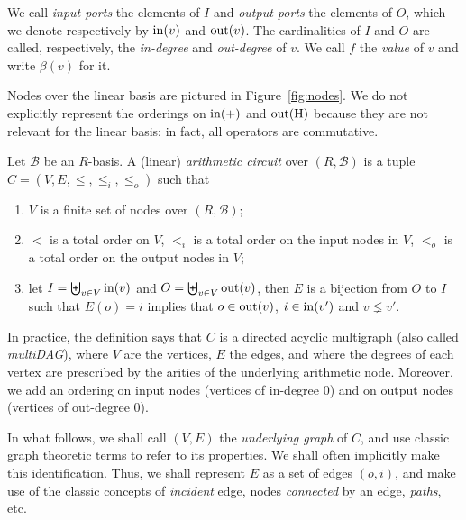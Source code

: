We call \emph{input ports} the elements of $I$
and \emph{output ports} the elements of $O$,
which we denote respectively by
$\operatorname{in}(v)$ and
$\operatorname{out}(v)$. The cardinalities of $I$ and $O$ are called, respectively,
the \emph{in-degree} and \emph{out-degree} of $v$.
We call $f$ the \emph{value} of $v$ and write
$\beta(v)$ for it.

Nodes over the linear basis are pictured in Figure~\ref{fig:nodes}. We
do not explicitly represent the orderings on $\operatorname{in}(+)$ and
$\operatorname{out}(\operatorname{H})$ because they are not relevant for the linear basis: in
fact, all operators are commutative.

\begin{definition}
  Let $\mathcal{B}$ be an $R$-basis. A (linear) \emph{arithmetic circuit} over $(R,\mathcal{B})$ is a
  tuple $C=(V,E,\le,\le_i,\le_o)$ such that
  \begin{enumerate}
  \item $V$ is a finite set of nodes over $(R,\mathcal{B})$;
  \item $<$ is a total order on $V$, $<_i$ is a total order on the
    input nodes in $V$, $<_o$ is a total order on the output nodes in
    $V$;
  \item let $I=\biguplus_{v\in V}\operatorname{in}(v)$ and $O=\biguplus_{v\in
      V}\operatorname{out}(v)$, then $E$ is a bijection from $O$ to $I$ such that
    $E(o)=i$ implies that $o\in\operatorname{out}(v)$, $i\in\operatorname{in}(v')$ and $v\lneq
    v'$.
  \end{enumerate}
\end{definition}

In practice, the definition says that $C$ is a directed acyclic
multigraph (also called \emph{multiDAG}), where $V$
are the vertices, $E$ the edges, and where
the degrees of each vertex are prescribed by the
arities of the underlying arithmetic node. Moreover, we add an
ordering on input nodes (vertices of in-degree $0$) and on output
nodes (vertices of out-degree $0$). 

In what follows, we shall call $(V,E)$ the
\emph{underlying graph} of $C$, and use
classic graph theoretic terms to refer to its properties. We shall
often implicitly make this identification. Thus, we shall represent
$E$ as a set of edges $(o,i)$, and make use of the classic concepts of
\emph{incident} edge, nodes \emph{connected} by an edge, \emph{paths},
etc.

